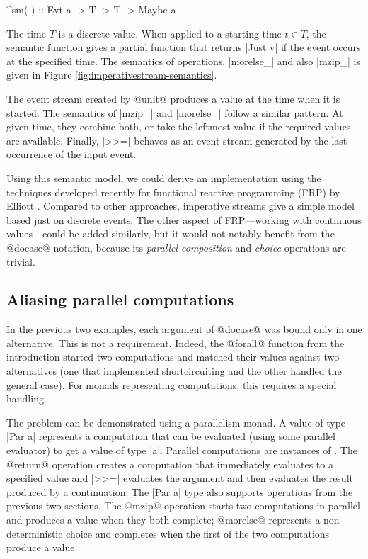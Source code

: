 \documentclass[preprint]{sigplanconf}
\begin{document}
\begin{code}
^sm(-) :: Evt a -> T -> T -> Maybe a
\end{code}
The time $T$ is a discrete value. When applied to a starting time $t \in T$, the semantic function 
gives a partial function that returns |Just v| if the event occurs at the specified time.
The semantics of  operations, |morelse_| and also |mzip_| is given in 
Figure \ref{fig:imperativestream-semantics}.

The event stream created by @unit@ produces a value at the time when it is started.
The semantics of |mzip_| and |morelse_| follow a similar pattern. At given time, they combine 
both, or take the leftmost value if the required values are available. Finally, |>>=| behaves as 
an event stream generated by the last occurrence of the input event.

Using this semantic model, we could derive an implementation using the techniques developed recently 
for functional reactive programming (FRP) by Elliott \cite{push-pull-frp}. Compared to other 
approaches, imperative streams give a simple model based just on discrete events. The other aspect 
of FRP---working with continuous values---could be added similarly, but it would not notably benefit 
from the @docase@ notation, because its \textit{parallel composition} and \textit{choice} operations
are trivial.


\subsection{Aliasing parallel computations}
\label{sec:intro-aliasing-parallel}

In the previous two examples, each argument of @docase@ was bound only in one alternative.
This is not a requirement. Indeed, the @forall@ function from the introduction started two 
computations and matched their values against two alternatives (one that implemented shortcircuiting
and the other handled the general case). For monads representing computations, this requires a special handling.

The problem can be demonstrated using a parallelism monad. A value of type
|Par a| represents a computation that can be evaluated (using some parallel evaluator) to get a 
value of type |a|. Parallel computations are instances of . The @return@
operation creates a computation that immediately evaluates to a specified value and |>>=| 
evaluates the argument and then evaluates the result produced by a continuation.
The |Par a| type also supports operations from the previous two sections. The @mzip@ operation 
starts two computations in parallel and produces a value when they both complete; @morelse@
represents a non-deterministic choice and completes when the first of the two computations 
produce a value.
\end{document}
